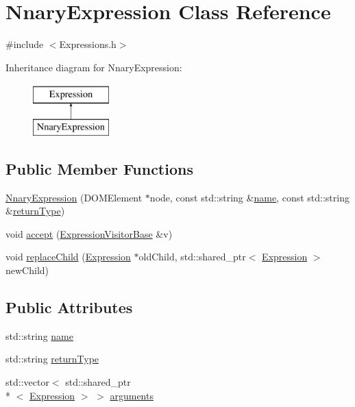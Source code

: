 \hypertarget{class_nnary_expression}{\section{Nnary\+Expression Class Reference}
\label{class_nnary_expression}
}


{\ttfamily \#include $<$Expressions.\+h$>$}

Inheritance diagram for Nnary\+Expression\+:\begin{figure}[H]
\begin{center}
\leavevmode
\includegraphics[height=2.000000cm]{class_nnary_expression}
\end{center}
\end{figure}
\subsection*{Public Member Functions}
\begin{DoxyCompactItemize}
\item 
\hyperlink{class_nnary_expression_a38f44966213fd5d674aaff3ef9de37da}{Nnary\+Expression} (D\+O\+M\+Element $\ast$node, const std\+::string \&\hyperlink{class_nnary_expression_ab21462327a70e8955c74cd8cc3fc428f}{name}, const std\+::string \&\hyperlink{class_nnary_expression_a70b8058f410ed9f52b610e74489bf03f}{return\+Type})
\item 
void \hyperlink{class_nnary_expression_a5934f3925e13888b3241f6b269d5ee44}{accept} (\hyperlink{class_expression_visitor_base}{Expression\+Visitor\+Base} \&v)
\item 
void \hyperlink{class_nnary_expression_a1161a6f8776c4cc946d769e4526339a2}{replace\+Child} (\hyperlink{class_expression}{Expression} $\ast$old\+Child, std\+::shared\+\_\+ptr$<$ \hyperlink{class_expression}{Expression} $>$ new\+Child)
\end{DoxyCompactItemize}
\subsection*{Public Attributes}
\begin{DoxyCompactItemize}
\item 
std\+::string \hyperlink{class_nnary_expression_ab21462327a70e8955c74cd8cc3fc428f}{name}
\item 
std\+::string \hyperlink{class_nnary_expression_a70b8058f410ed9f52b610e74489bf03f}{return\+Type}
\item 
std\+::vector$<$ std\+::shared\+\_\+ptr\\*
$<$ \hyperlink{class_expression}{Expression} $>$ $>$ \hyperlink{class_nnary_expression_ae70d24059bba49f089137557e18f41a9}{arguments}
\end{DoxyCompactItemize}
